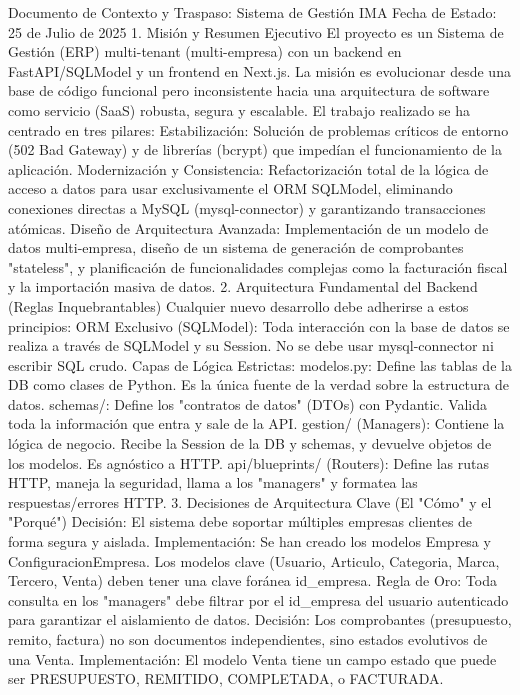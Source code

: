 Documento de Contexto y Traspaso: Sistema de Gestión IMA
Fecha de Estado: 25 de Julio de 2025
1. Misión y Resumen Ejecutivo
El proyecto es un Sistema de Gestión (ERP) multi-tenant (multi-empresa) con un backend en FastAPI/SQLModel y un frontend en Next.js. La misión es evolucionar desde una base de código funcional pero inconsistente hacia una arquitectura de software como servicio (SaaS) robusta, segura y escalable.
El trabajo realizado se ha centrado en tres pilares:
Estabilización: Solución de problemas críticos de entorno (502 Bad Gateway) y de librerías (bcrypt) que impedían el funcionamiento de la aplicación.
Modernización y Consistencia: Refactorización total de la lógica de acceso a datos para usar exclusivamente el ORM SQLModel, eliminando conexiones directas a MySQL (mysql-connector) y garantizando transacciones atómicas.
Diseño de Arquitectura Avanzada: Implementación de un modelo de datos multi-empresa, diseño de un sistema de generación de comprobantes "stateless", y planificación de funcionalidades complejas como la facturación fiscal y la importación masiva de datos.
2. Arquitectura Fundamental del Backend (Reglas Inquebrantables)
Cualquier nuevo desarrollo debe adherirse a estos principios:
ORM Exclusivo (SQLModel): Toda interacción con la base de datos se realiza a través de SQLModel y su Session. No se debe usar mysql-connector ni escribir SQL crudo.
Capas de Lógica Estrictas:
modelos.py: Define las tablas de la DB como clases de Python. Es la única fuente de la verdad sobre la estructura de datos.
schemas/: Define los "contratos de datos" (DTOs) con Pydantic. Valida toda la información que entra y sale de la API.
gestion/ (Managers): Contiene la lógica de negocio. Recibe la Session de la DB y schemas, y devuelve objetos de los modelos. Es agnóstico a HTTP.
api/blueprints/ (Routers): Define las rutas HTTP, maneja la seguridad, llama a los "managers" y formatea las respuestas/errores HTTP.
3. Decisiones de Arquitectura Clave (El "Cómo" y el "Porqué")
Decisión: El sistema debe soportar múltiples empresas clientes de forma segura y aislada.
Implementación:
Se han creado los modelos Empresa y ConfiguracionEmpresa.
Los modelos clave (Usuario, Articulo, Categoria, Marca, Tercero, Venta) deben tener una clave foránea id_empresa.
Regla de Oro: Toda consulta en los "managers" debe filtrar por el id_empresa del usuario autenticado para garantizar el aislamiento de datos.
Decisión: Los comprobantes (presupuesto, remito, factura) no son documentos independientes, sino estados evolutivos de una Venta.
Implementación:
El modelo Venta tiene un campo estado que puede ser PRESUPUESTO, REMITIDO, COMPLETADA, o FACTURADA.
